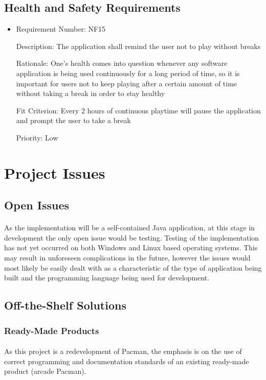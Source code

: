 \documentclass[12pt, titlepage]{article}
\begin{document}
\subsection{Health and Safety Requirements}
\begin{itemize}
	\item
	Requirement Number: NF15

	Description: The application shall remind the user not to play without breaks

	Rationale: One's health comes into question whenever any software application is being used continuously for a long period of time, so it is important for users not to keep playing after a certain amount of time without taking a break in order to stay healthy

	Fit Criterion: Every 2 hours of continuous playtime will pause the application and prompt the user to take a break

	Priority: Low
\end{itemize}

\section{Project Issues}

\subsection{Open Issues}
\paragraph{}
As the implementation will be a self-contained Java application, at this stage in development the only open issue would be testing. Testing of the implementation has not yet occurred on both Windows and Linux based operating systems. 
This may result in unforeseen complications in the future, however the issues would most likely be easily dealt with as a characteristic of the type of application being built and the programming language being used for development.

\subsection{Off-the-Shelf Solutions}

\subsubsection{Ready-Made Products}
\paragraph{}
As this project is a redevelopment of Pacman, the emphasis is on the use of correct programming and documentation standards of an existing ready-made product (arcade Pacman).
\end{document}
